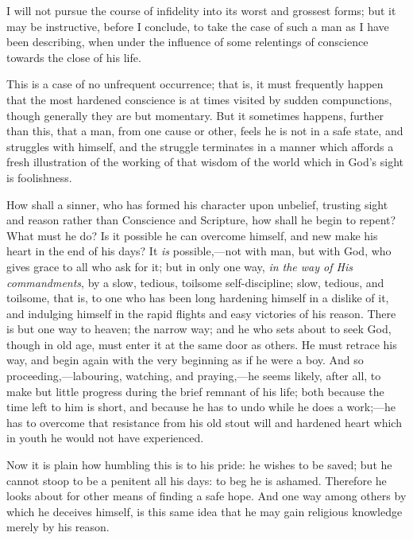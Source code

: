 I will not pursue the course of infidelity into its
worst and grossest forms; but it may be instructive,
before I conclude, to take the case of such a man as I
have been describing, when under the influence of some
relentings of conscience towards the close of his life.

This is a case of no unfrequent occurrence; that is,
it must frequently happen that the most hardened
conscience is at times visited by sudden compunctions,
though generally they are but momentary. But it sometimes
happens, further than this, that a man, from one cause or
other, feels he is not in a safe state, and struggles
with himself, and the struggle terminates in a manner
which affords a fresh illustration of the working of that
wisdom of the world which in God's sight is foolishness.

How shall a sinner, who has formed his character upon
unbelief, trusting sight and reason rather than
Conscience and Scripture, how shall he begin to repent?
What must he do? Is it possible he can overcome himself, and new make his heart in the end of his days? It \emph{is}
possible,—not with man, but with God, who gives
grace to all who ask for it; but in only one way, \emph{in
the way of His commandments}, by a slow, tedious,
toilsome self-discipline; slow, tedious, and toilsome,
that is, to one who has been long hardening himself in a
dislike of it, and indulging himself in the rapid flights
and easy victories of his reason. There is but one way to
heaven; the narrow way; and he who sets about to seek
God, though in old age, must enter it at the same door as
others. He must retrace his way, and begin again with the
very beginning as if he were a boy. And so
proceeding,—labouring, watching, and
praying,—he seems likely, after all, to make but
little progress during the brief remnant of his life;
both because the time left to him is short, and because
he has to undo while he does a work;—he has to
overcome that resistance from his old stout will and
hardened heart which in youth he would not have
experienced.

Now it is plain how humbling this is to his pride: he
wishes to be saved; but he cannot stoop to be a penitent
all his days: to beg he is ashamed. Therefore he looks
about for other means of finding a safe hope. And one way
among others by which he deceives himself, is this same
idea that he may gain religious knowledge merely by his
reason.

